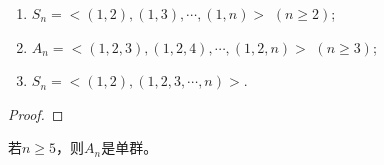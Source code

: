 \begin{proposition}
	\begin{enumerate}
		\item $S_{n}=<(1,2),(1,3),\cdots,(1,n)>\,\,(n\geq 2)$;
		\item $A_{n}=<(1,2,3),(1,2,4),\cdots,(1,2,n)>\,\,(n\geq 3)$;
		\item $S_{n}=<(1,2),(1,2,3,\cdots,n)>$.
	\end{enumerate}
\end{proposition}

\begin{proof}
	
\end{proof}

\begin{theorem}
	若$n\geq 5$，则$A_{n}$是单群。
\end{theorem}

